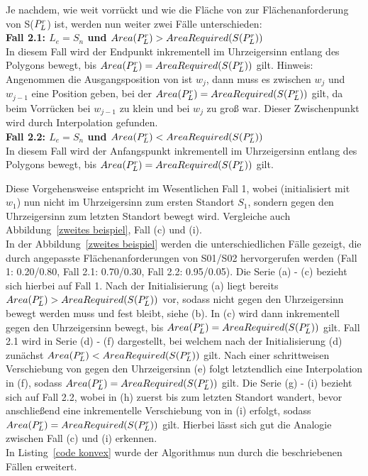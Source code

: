 \documentclass[ngerman]{seminarbeitrag}
\begin{document}
Je nachdem, wie weit \Le vorrückt und wie die Fläche von \prl zur Flächenanforderung von S($P_{L}^{r}$) ist, werden nun weiter zwei Fälle unterschieden:\\

\textbf{Fall 2.1: $L_{e} = S_{n}$ und $Area(P_{L}^{r})>AreaRequired(S(P_{L}^{r}))$} \\
In diesem Fall wird der Endpunkt \Le inkrementell im Uhrzeigersinn entlang des Polygons bewegt, bis $Area(P_{L}^{r})=AreaRequired(S(P_{L}^{r}))$ gilt.
Hinweis: Angenommen die Ausgangsposition von \Le ist $w_{j}$, dann muss es zwischen $w_{j}$ und $w_{j-1}$ eine Position geben, bei der $Area(P_{L}^{r})=AreaRequired(S(P_{L}^{r}))$ gilt, da beim Vorrücken \ar{\mprl} bei $w_{j-1}$ zu klein und bei $w_{j}$ zu groß war. Dieser Zwischenpunkt wird durch Interpolation gefunden.\\

\textbf{Fall 2.2: $L_{e} = S_{n}$ und $Area(P_{L}^{r})<AreaRequired(S(P_{L}^{r}))$} \\
In diesem Fall wird der Anfangspunkt \ls inkrementell im Uhrzeigersinn entlang des Polygons bewegt, bis $Area(P_{L}^{r})=AreaRequired(S(P_{L}^{r}))$ gilt.

Diese Vorgehensweise entspricht im Wesentlichen Fall 1, wobei \ls (initialisiert mit $w_{1}$) nun nicht im Uhrzeigersinn zum ersten Standort $S_{1}$, sondern gegen den Uhrzeigersinn zum letzten Standort bewegt wird. Vergleiche auch Abbildung~\ref{zweites beispiel}, Fall (c) und (i).\\

In der Abbildung~\ref{zweites beispiel} werden die unterschiedlichen Fälle gezeigt, die durch angepasste Flächenanforderungen von S01/S02 hervorgerufen werden (Fall 1: 0.20/0.80, Fall 2.1: 0.70/0.30, Fall 2.2: 0.95/0.05). Die Serie (a) - (c) bezieht sich hierbei auf Fall 1. Nach der Initialisierung (a) liegt bereits $Area(P_{L}^{r}) > AreaRequired(S(P_{L}^{r}))$ vor, sodass \Le nicht gegen den Uhrzeigersinn bewegt werden muss und fest bleibt, siehe (b). In (c) wird \ls dann inkrementell gegen den Uhrzeigersinn bewegt, bis $Area(P_{L}^{r})=AreaRequired(S(P_{L}^{r}))$ gilt. Fall 2.1 wird in Serie (d) - (f) dargestellt, bei welchem nach der Initialisierung (d) zunächst $Area(P_{L}^{r}) < AreaRequired(S(P_{L}^{r}))$ gilt. Nach einer schrittweisen Verschiebung von \Le gegen den Uhrzeigersinn (e) folgt letztendlich eine Interpolation in (f), sodass $Area(P_{L}^{r})=AreaRequired(S(P_{L}^{r}))$ gilt. Die Serie (g) - (i) bezieht sich auf Fall 2.2, wobei \Le in (h) zuerst bis zum letzten Standort wandert, bevor anschließend eine inkrementelle Verschiebung von \ls in (i) erfolgt, sodass $Area(P_{L}^{r})=AreaRequired(S(P_{L}^{r}))$ gilt. Hierbei lässt sich gut die Analogie zwischen Fall (c) und (i) erkennen.\\
In Listing~\ref{code konvex} wurde der Algorithmus \con nun durch die beschriebenen Fällen erweitert.
\end{document}
